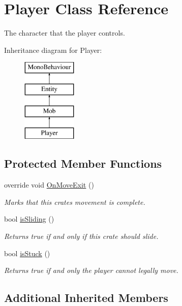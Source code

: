 \hypertarget{class_player}{}\section{Player Class Reference}
\label{class_player}


The character that the player controls.  


Inheritance diagram for Player\+:\begin{figure}[H]
\begin{center}
\leavevmode
\includegraphics[height=4.000000cm]{class_player}
\end{center}
\end{figure}
\subsection*{Protected Member Functions}
\begin{DoxyCompactItemize}
\item 
override void \mbox{\hyperlink{class_player_a10405c2b24c0b79a4b7033f733aceaf4}{On\+Move\+Exit}} ()
\begin{DoxyCompactList}\small\item\em Marks that this crate\textquotesingle{}s movement is complete. \end{DoxyCompactList}\item 
bool \mbox{\hyperlink{class_player_ae7c1a20db6171c3062e9dde30ea86048}{is\+Sliding}} ()
\begin{DoxyCompactList}\small\item\em Returns true if and only if this crate should slide. \end{DoxyCompactList}\item 
bool \mbox{\hyperlink{class_player_a3f36261a8b0622c04942d54e609da6e4}{is\+Stuck}} ()
\begin{DoxyCompactList}\small\item\em Returns true if and only the player cannot legally move. \end{DoxyCompactList}\end{DoxyCompactItemize}
\subsection*{Additional Inherited Members}


